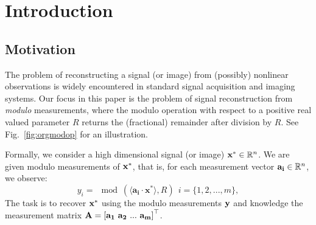 \section{Introduction}
\label{sec:intro}
\subsection{Motivation}
\label{subsec:motivation}
The problem of reconstructing a signal (or image) from (possibly) nonlinear observations is widely encountered in standard signal acquisition and imaging systems. Our focus in this paper is the problem of signal reconstruction from \textit{modulo} measurements, where the modulo operation with respect to a positive real valued parameter $R$ returns the (fractional) remainder after division by $R$. See Fig.~\ref{fig:orgmodop} for an illustration.


Formally, we consider a high dimensional signal (or image) $\mathbf{x}^* \in {\mathbb{R}}^n$. We are given modulo measurements of $\mathbf{x^*}$, that is, for each measurement vector $\mathbf{a_i} \in {\mathbb{R}}^n$, we observe:
\begin{equation}
y_i=\mod(\langle \mathbf{a_i} \cdot \mathbf{x^*} \rangle,R)~~i = \{1,2,...,m\}, %
\label{eq:modmeas0}
\end{equation} 
The task is to recover $\mathbf{x^*}$ using the modulo measurements $\mathbf{y}$ and knowledge the measurement matrix $\mathbf{A} = \left[\mathbf{a_1~a_2~...~a_m}\right]^\top$. %


